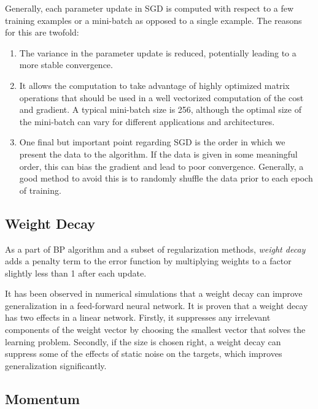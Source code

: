 Generally, each parameter update in SGD is computed with respect to a few training examples or a mini-batch as opposed to a single example. The reasons for this are twofold\cite{sgd}:
\begin{enumerate}
	\item The variance in the parameter update is reduced, potentially leading to a more stable convergence. 
	\item It allows the computation to take advantage of highly optimized matrix operations that should be used in a well vectorized computation of the cost and gradient.  A typical mini-batch size is 256, although the optimal size of the mini-batch can vary for different applications and architectures.
	\item One final but important point regarding SGD is the order in which we present the data to the algorithm. If the data is given in some meaningful order, this can bias the gradient and lead to poor convergence. Generally, a good method to avoid this is to randomly shuffle the data prior to each epoch of training.
\end{enumerate}

\subsection{Weight Decay}

As a part of BP algorithm and a subset of regularization methods, \textit{weight decay} adds a penalty term to the error function by multiplying weights to a factor slightly less than 1 after each update. 

 It has been observed in numerical simulations that a weight decay can improve generalization in a feed-forward neural network. It is proven that a weight decay has two effects in a linear network. Firstly, it suppresses any irrelevant components of the weight vector by choosing the smallest vector that solves the learning problem. Secondly, if the size is chosen right, a weight decay can suppress some of the effects of static noise on the targets, which improves generalization significantly\cite{moody1995simple}. 

\subsection{Momentum}

